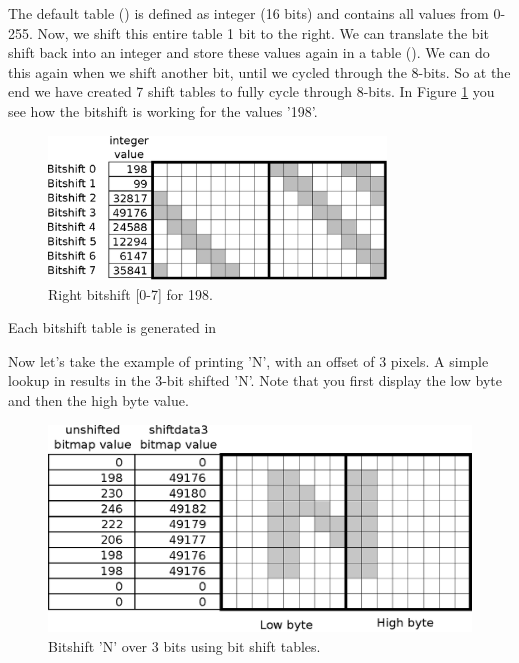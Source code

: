 \documentclass[book.tex]{subfiles}
\begin{document}
The default table () is defined as integer (16 bits) and contains all values from 0-255. Now, we shift this entire table 1 bit to the right. We can translate the bit shift back into an integer and store these values again in a table (). We can do this again when we shift another bit, until we cycled through the 8-bits. So at the end we have created 7 shift tables to fully cycle through 8-bits. In Figure \ref{fig:shiftttable} you see how the bitshift is working for the values '198'.
\begin{figure}[H]
\centering
 \includegraphics[width=0.8\textwidth]{imgs/drawings/shift_tables.eps}
 \caption{Right bitshift [0-7] for 198.}
 \label{fig:shiftttable}
 \end{figure}
 \par

Each bitshift table is generated in  \\
\begin{minipage}{\textwidth}
  
\end{minipage}
\label{wallclip_array}
\par
 

Now let's take the example of printing 'N', with an offset of 3 pixels. A simple lookup in  results in the 3-bit shifted 'N'. Note that you first display the low byte and then the high byte value. \\
\begin{figure}[H]
\centering
 \includegraphics[width=\textwidth]{imgs/drawings/text_bitshift_N.eps}
 \caption{Bitshift 'N' over 3 bits using bit shift tables.}
 \label{fig:text_bitshift_N}
 \end{figure}
 \par
\end{document}
